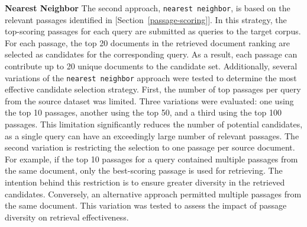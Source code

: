 \textbf{Nearest Neighbor} The second approach, \texttt{nearest neighbor}, is based on the relevant passages identified in [Section~\ref{passage-scoring}]. In this strategy, the top-scoring passages for each query are submitted as queries to the target corpus. For each passage, the top 20 documents in the retrieved document ranking are selected as candidates for the corresponding query. As a result, each passage can contribute up to 20 unique documents to the candidate set. Additionally, several variations of the \texttt{nearest neighbor} approach were tested to determine the most effective candidate selection strategy. First, the number of top passages per query from the source dataset was limited. Three variations were evaluated: one using the top 10 passages, another using the top 50, and a third using the top 100 passages. This limitation significantly reduces the number of potential candidates, as a single query can have an exceedingly large number of relevant passages. The second variation is restricting the selection to one passage per source document. For example, if the top 10 passages for a query contained multiple passages from the same document, only the best-scoring passage is used for retrieving. The intention behind this restriction is to ensure greater diversity in the retrieved candidates. Conversely, an alternative approach permitted multiple passages from the same document. This variation was tested to assess the impact of passage diversity on retrieval effectiveness.
